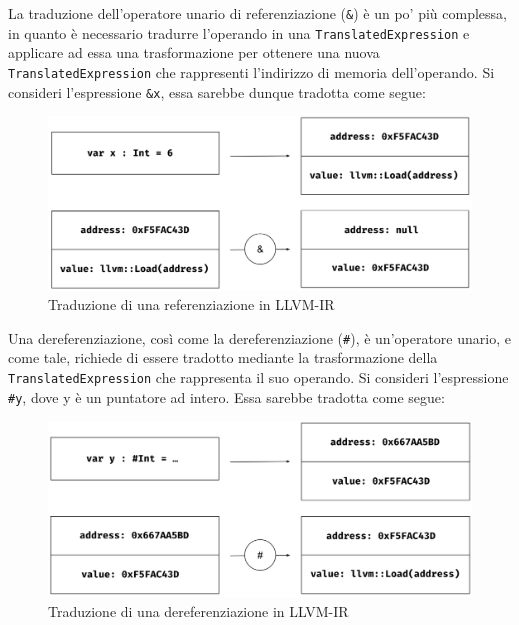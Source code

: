 \newpage

La traduzione dell'operatore unario di referenziazione (\texttt{\&}) è un po' più complessa, in quanto è necessario
tradurre l'operando in una \texttt{TranslatedExpression} e applicare ad essa una trasformazione per ottenere una nuova 
\texttt{TranslatedExpression} che rappresenti l'indirizzo di memoria dell'operando. Si consideri l'espressione \texttt{\&x}, essa
sarebbe dunque tradotta come segue: \\

\vspace{0.3cm}
\begin{figure}[H]
    \includegraphics[width=\textwidth]{../../Assets/LLVMExpr3}
    \caption{Traduzione di una referenziazione in LLVM-IR}
\end{figure}
\vspace{0.3cm}

Una dereferenziazione, così come la dereferenziazione (\texttt{\#}), è un'operatore unario, e come tale, richiede di essere 
tradotto mediante la trasformazione della \texttt{TranslatedExpression} che rappresenta il suo operando. Si consideri
l'espressione \texttt{\#y}, dove y è un puntatore ad intero. Essa sarebbe tradotta come segue: \\

\vspace{0.3cm}
\begin{figure}[H]
    \includegraphics[width=\textwidth]{../../Assets/LLVMExpr4}
    \caption{Traduzione di una dereferenziazione in LLVM-IR}
\end{figure}
\vspace{0.3cm}

